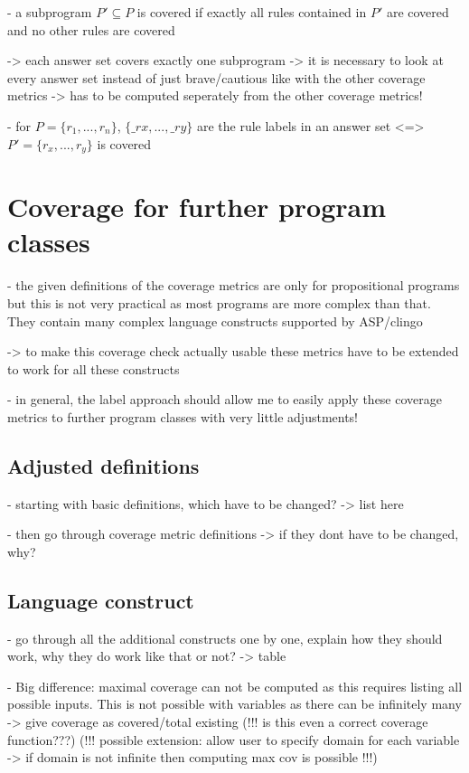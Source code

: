 - a subprogram $P' \subseteq P$ is covered if exactly all rules contained in $P'$ are covered and no other rules are covered

-> each answer set covers exactly one subprogram -> it is necessary to look at every answer set instead of just brave/cautious like 
with the other coverage metrics -> has to be computed seperately from the other coverage metrics!

- for $P = \{r_1,...,r_n\}$,  $\{\_rx,...,\_ry\}$ are the rule labels in an answer set <=> $P'=\{r_x,...,r_y\}$ is covered

\chapter{Coverage for further program classes}
\label{ch:Coverage for further program classes}
- the given definitions of the coverage metrics are only for propositional programs but this is not very practical as most programs 
are more complex than that. They contain many complex language constructs supported by ASP/clingo

-> to make this coverage check actually usable these metrics have to be extended to work for all these constructs

- in general, the label approach should allow me to easily apply these coverage metrics to further program classes with very little 
adjustments!

\section{Adjusted definitions}
\label{sec:Coverage for further program classes/Adjusted definitions}
- starting with basic definitions, which have to be changed? -> list here

- then go through coverage metric definitions -> if they dont have to be changed, why?

\section{Language construct}
\label{sec:Coverage for further program classes/Language constructs}
- go through all the additional constructs one by one, explain how they should work, why they do work like that or not?
-> table

- Big difference: maximal coverage can not be computed as this requires listing all possible inputs. This is not possible with variables 
as there can be infinitely many -> give coverage as covered/total existing (!!! is this even a correct coverage function???)
(!!! possible extension: allow user to specify domain for each variable -> if domain is not infinite then computing max cov is possible !!!) 

